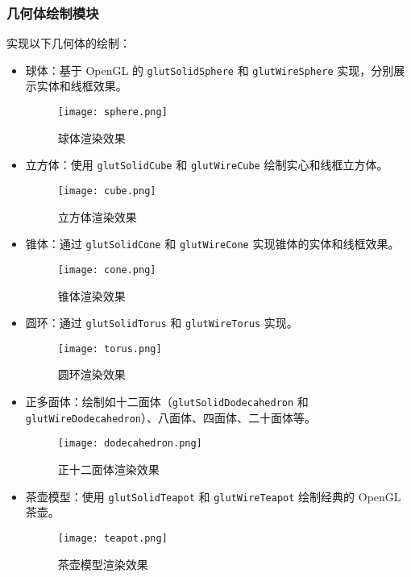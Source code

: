 \documentclass[11pt,a4paper]{article}
\begin{document}
\subsubsection{几何体绘制模块}
实现以下几何体的绘制：
\begin{itemize}
    \item 球体：基于 OpenGL 的 \texttt{glutSolidSphere} 和 \texttt{glutWireSphere} 实现，分别展示实体和线框效果。
    \begin{figure}[h]
        \centering
        \texttt{[image: sphere.png]}
        \caption{球体渲染效果}
    \end{figure}
    
    \item 立方体：使用 \texttt{glutSolidCube} 和 \texttt{glutWireCube} 绘制实心和线框立方体。
    \begin{figure}[h]
        \centering
        \texttt{[image: cube.png]}
        \caption{立方体渲染效果}
    \end{figure}

    \item 锥体：通过 \texttt{glutSolidCone} 和 \texttt{glutWireCone} 实现锥体的实体和线框效果。
    \begin{figure}[h]
        \centering
        \texttt{[image: cone.png]}
        \caption{锥体渲染效果}
    \end{figure}

    \item 圆环：通过 \texttt{glutSolidTorus} 和 \texttt{glutWireTorus} 实现。
    \begin{figure}[h]
        \centering
        \texttt{[image: torus.png]}
        \caption{圆环渲染效果}
    \end{figure}

    \item 正多面体：绘制如十二面体（\texttt{glutSolidDodecahedron} 和 \texttt{glutWireDodecahedron}）、八面体、四面体、二十面体等。
    \begin{figure}[h]
        \centering
        \texttt{[image: dodecahedron.png]}
        \caption{正十二面体渲染效果}
    \end{figure}

    \item 茶壶模型：使用 \texttt{glutSolidTeapot} 和 \texttt{glutWireTeapot} 绘制经典的 OpenGL 茶壶。
    \begin{figure}[h]
        \centering
        \texttt{[image: teapot.png]}
        \caption{茶壶模型渲染效果}
    \end{figure}
\end{itemize}
\end{document}
